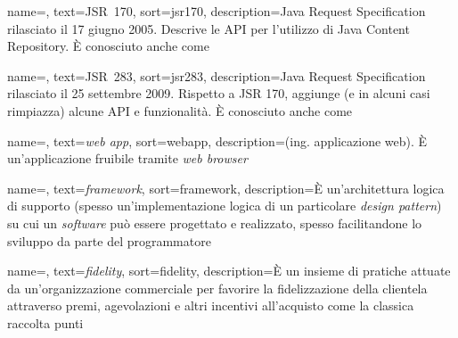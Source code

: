 
\renewcommand{\acronymname}{Acronimi e abbreviazioni}





 {
	name=,
	text=\mbox{JSR 170},
	sort=jsr170,
	description={Java Request Specification rilasciato il 17 giugno 2005. Descrive le API per l'utilizzo di Java Content Repository. È conosciuto anche come }
}

 {
	name=,
	text=\mbox{JSR 283},
	sort=jsr283,
	description={Java Request Specification rilasciato il 25 settembre 2009. Rispetto a JSR 170, aggiunge (e in alcuni casi rimpiazza) alcune API e funzionalità. È conosciuto anche come }
}

 {
	name=,
	text=\textit{web app},
	sort=webapp,
	description={(ing. applicazione web). È un'applicazione fruibile tramite \textit{web browser}}
}

 {
	name=,
	text=\textit{framework},
	sort=framework,
	description={È un'architettura logica di supporto (spesso un'implementazione logica di un particolare \textit{design pattern}) su cui un \textit{software} può essere progettato e realizzato, spesso facilitandone lo sviluppo da parte del programmatore}
}

 {
	name=,
	text=\textit{fidelity},
	sort=fidelity,
	description={È un insieme di pratiche attuate da un'organizzazione commerciale per favorire la fidelizzazione della clientela attraverso premi, agevolazioni e altri incentivi all’acquisto come la classica raccolta punti}
}

